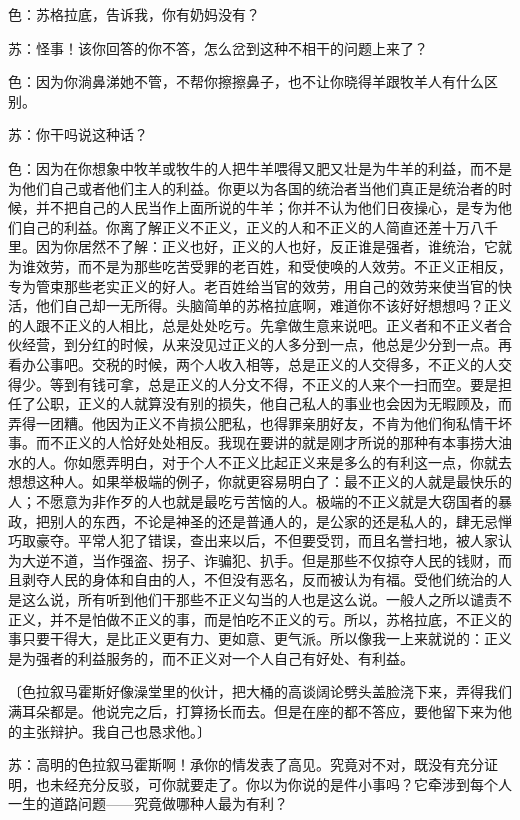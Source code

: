 \documentclass[12pt,oneside]{book}
\begin{document}
色：苏格拉底，告诉我，你有奶妈没有？

苏：怪事！该你回答的你不答，怎么岔到这种不相干的问题上来了？

色：因为你淌鼻涕她不管，不帮你擦擦鼻子，也不让你晓得羊跟牧羊人有什么区别。

苏：你干吗说这种话？

色：因为在你想象中牧羊或牧牛的人把牛羊喂得又肥又壮是为牛羊的利益，而不是为他们自己或者他们主人的利益。你更以为各国的统治者当他们真正是统治者的时候，并不把自己的人民当作上面所说的牛羊；你并不认为他们日夜操心，是专为他们自己的利益。你离了解正义不正义，正义的人和不正义的人简直还差十万八千里。因为你居然不了解：正义也好，正义的人也好，反正谁是强者，谁统治，它就为谁效劳，而不是为那些吃苦受罪的老百姓，和受使唤的人效劳。不正义正相反，专为管束那些老实正义的好人。老百姓给当官的效劳，用自己的效劳来使当官的快活，他们自己却一无所得。头脑简单的苏格拉底啊，难道你不该好好想想吗？正义的人跟不正义的人相比，总是处处吃亏。先拿做生意来说吧。正义者和不正义者合伙经营，到分红的时候，从来没见过正义的人多分到一点，他总是少分到一点。再看办公事吧。交税的时候，两个人收入相等，总是正义的人交得多，不正义的人交得少。等到有钱可拿，总是正义的人分文不得，不正义的人来个一扫而空。要是担任了公职，正义的人就算没有别的损失，他自己私人的事业也会因为无暇顾及，而弄得一团糟。他因为正义不肯损公肥私，也得罪亲朋好友，不肯为他们徇私情干坏事。而不正义的人恰好处处相反。我现在要讲的就是刚才所说的那种有本事捞大油水的人。你如愿弄明白，对于个人不正义比起正义来是多么的有利这一点，你就去想想这种人。如果举极端的例子，你就更容易明白了：最不正义的人就是最快乐的人；不愿意为非作歹的人也就是最吃亏苦恼的人。极端的不正义就是大窃国者的暴政，把别人的东西，不论是神圣的还是普通人的，是公家的还是私人的，肆无忌惮巧取豪夺。平常人犯了错误，查出来以后，不但要受罚，而且名誉扫地，被人家认为大逆不道，当作强盗、拐子、诈骗犯、扒手。但是那些不仅掠夺人民的钱财，而且剥夺人民的身体和自由的人，不但没有恶名，反而被认为有福。受他们统治的人是这么说，所有听到他们干那些不正义勾当的人也是这么说。一般人之所以谴责不正义，并不是怕做不正义的事，而是怕吃不正义的亏。所以，苏格拉底，不正义的事只要干得大，是比正义更有力、更如意、更气派。所以像我一上来就说的：正义是为强者的利益服务的，而不正义对一个人自己有好处、有利益。

〔色拉叙马霍斯好像澡堂里的伙计，把大桶的高谈阔论劈头盖脸浇下来，弄得我们满耳朵都是。他说完之后，打算扬长而去。但是在座的都不答应，要他留下来为他的主张辩护。我自己也恳求他。〕

苏：高明的色拉叙马霍斯啊！承你的情发表了高见。究竟对不对，既没有充分证明，也未经充分反驳，可你就要走了。你以为你说的是件小事吗？它牵涉到每个人一生的道路问题——究竟做哪种人最为有利？
\end{document}
